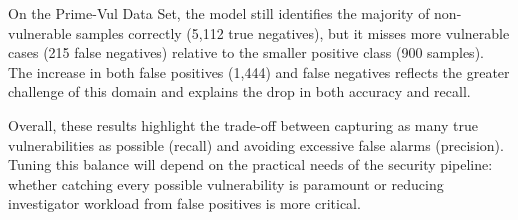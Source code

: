 \documentclass{article}
\begin{document}
On the Prime-Vul Data Set, the model still identifies the majority of non-vulnerable samples correctly (5,112 true negatives), but it misses more vulnerable cases (215 false negatives) relative to the smaller positive class (900 samples). The increase in both false positives (1,444) and false negatives reflects the greater challenge of this domain and explains the drop in both accuracy and recall.

Overall, these results highlight the trade-off between capturing as many true vulnerabilities as possible (recall) and avoiding excessive false alarms (precision). Tuning this balance will depend on the practical needs of the security pipeline: whether catching every possible vulnerability is paramount or reducing investigator workload from false positives is more critical.

\newpage
\end{document}
